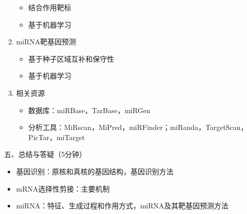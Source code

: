 \documentclass{TIJMUjiaoanLL}
\begin{document}
\begin{enumerate}
\begin{itemize}
      \item 结合作用靶标
      \item 基于机器学习
    \end{itemize}
  \item miRNA靶基因预测
    \begin{itemize}
      \item 基于种子区域互补和保守性
      \item 基于机器学习
    \end{itemize}
  \item 相关资源
    \begin{itemize}
      \item 数据库：miRBase，TarBase，miRGen
      \item 分析工具：MiRscan，MiPred，miRFinder；miRanda，TargetScan，PicTar，miTarget
    \end{itemize}
\end{enumerate}

\vspace*{0.2cm}
\noindent
五、总结与答疑（5分钟）
\begin{itemize}
  \item 基因识别：原核和真核的基因结构，基因识别方法
  \item mRNA选择性剪接：主要机制
  \item miRNA：特征、生成过程和作用方式，miRNA及其靶基因预测方法
\end{itemize}



\otherTail
\end{document}
